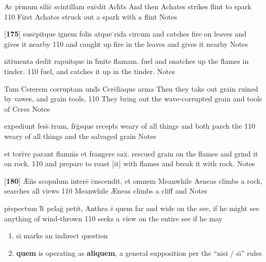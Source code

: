 \latline
  {Ac pr\={\macron {\i}}mum silic\={\macron {\i}} scintillam exc\={}dit Ach\={}t\={}s}
  { And then Achates strikes flint to spark }
  {110}
  { First Achates struck out a spark with a flint }
  { Notes }



\latline
  {[\textbf{175}] susc\={}pitque ignem foli\={\macron {\i}}s atque \={}rida circum}
  { and catches fire on leaves and gives it nearby }
  {110}
  { and caught up fire in the leaves and gives it nearby }
  { Notes }


\latline
  {n\={}tr\={\macron {\i}}menta dedit rapuitque in f\={}mite flamam.}
  { fuel and snatches up the flames in tinder. }
  {110}
  { fuel, and catches it up in the tinder. }
  { Notes }


\latline
  {Tum Cererem corruptam und\={\macron {\i}}s Cere\={}liaque arma}
  { Then they take out grain ruined by vawes, and grain tools, }
  {110}
  { They bring out the wave-corrupted grain and tools of Ceres }
  { Notes }



\latline
  {expediunt fess\={\macron {\i}} r\={}rum, fr\={}g\={}sque recept\={}s}
  { weary of all things and both parch the  }
  {110}
  { weary of all things and the salvaged grain }
  { Notes }


\latline
  {et torr\={}re parant flamm\={\macron {\i}}s et frangere sax\={}.}
  { rescued grain on the flames and grind it on rock. }
  {110}
  { and prepare to roast [it] with flames and break it with rock. }
  { Notes }


\latline
  {[\textbf{180}] {\AE}n\={}\={}s scopulum intere\={} c\={}nscendit, et omnem}
  { Meanwhile Aeneas climbs a rock, searches all views }
  {110}
  { Meanwhile {\AE}neas climbs a cliff and  }
  { Notes }



\latline
  {pr\={}spectum l\={}t\={} pelag\={} petit, Anthea s\={\macron {\i}} quem}
  { far and wide on the see, if he might see anything of wind-thrown }
  {110}
  { seeks a view on the entire see if he may  }
  { \begin{enumerate}
  	\item s\={\i} marks an indirect question
  	\item \textbf{quem} is operating as \textbf{aliquem}, a general supposition per the ``nisi / s\={\i}'' rules
  \end{enumerate} }


